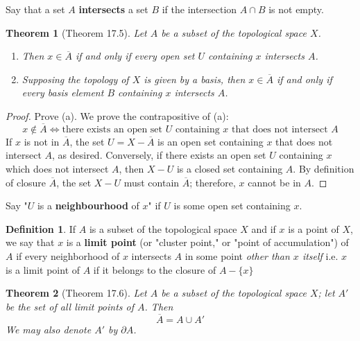 \documentclass{article}
\newtheorem{theorem}{Theorem}
\theoremstyle{definition}
\newtheorem{definition}{Definition}[section]
\theoremstyle{remark}
\begin{document}
    Say that a set $A$ \textbf{intersects} a set $B$ if the intersection $A\cap B$ is not empty.

    \begin{theorem}[Theorem 17.5]
        Let $A$ be a subset of the topological space $X$.
        \begin{enumerate}
            \item Then $x\in\overline{A}$ if and only if every open set $U$ containing $x$ intersects $A$.
            \item Supposing the topology of $X$ is given by a basis, then $x\in\overline{A}$ if and only if every basis element
                $B$ containing $x$ intersects $A$.
        \end{enumerate}
    \end{theorem}
    \begin{proof}
        Prove (a). We prove the contrapositive of (a):
        \[ x\not\in\overline{A} \Leftrightarrow \text{there exists an open set $U$ containing $x$ that does not intersect $A$} \]
        If $x$ is not in $\overline{A}$, the set $U = X - \overline{A}$ is an open set containing $x$ that does not intersect
        $A$, as desired. Conversely, if there exists an open set $U$ containing $x$ which does not intersect $A$, then $X-U$ is a
        closed set containing $A$. By definition of closure $\overline{A}$, the set $X-U$ must contain $\overline{A}$; therefore,
        $x$ cannot be in $A$.
    \end{proof}
    
    Say "$U$ is a \textbf{neighbourhood} of $x$" if $U$ is some open set containing $x$.

    \begin{definition}
        If $A$ is a subset of the topological space $X$ and if $x$ is a point of $X$, we say that $x$ is a \textbf{limit point}
        (or "cluster point," or "point of accumulation") of $A$ if every neighborhood of $x$ intersects $A$ in some point
        \textit{other than $x$ itself} i.e. $x$ is a limit point of $A$ if it belongs to the closure of $A - \{x\}$
    \end{definition}

    \begin{theorem}[Theorem 17.6]
        Let $A$ be a subset of the topological space $X$; let $A'$ be the set of all limit points of $A$. Then
        \[ \overline{A} = A \cup A' \]
        We may also denote $A'$ by $\partial A$.
    \end{theorem}
\end{document}
